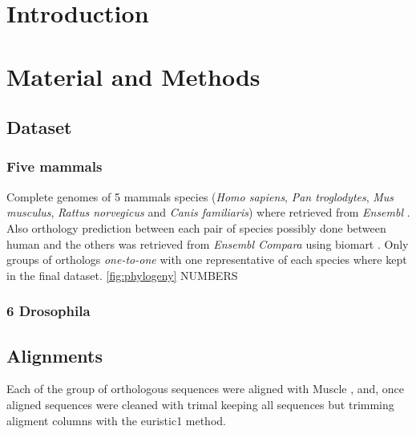 

\section{Introduction}

\section{Material and Methods}

\subsection{Dataset}

\subsubsection{Five mammals}

Complete genomes of 5 mammals species (\textit{Homo sapiens}, \textit{Pan troglodytes}, \textit{Mus musculus}, \textit{Rattus norvegicus} and \textit{Canis familiaris}) where retrieved from \textit{Ensembl} \cite{Flicek2011}. Also orthology prediction between each pair of species
possibly done between human and the others was retrieved from \textit{Ensembl Compara} \cite{Vilella2009} using biomart \cite{Kinsella2011}. Only groups of orthologs \textit{one-to-one} with one representative of each species where kept in the final dataset. \ref{fig:phylogeny}
NUMBERS

\subsubsection{6 Drosophila}

\subsection{Alignments}
Each of the group of orthologous sequences were aligned with Muscle \cite{Edgar2004}, and, once aligned sequences were cleaned with trimal \cite{Capella-Gutierrez2009} keeping all sequences but trimming aligment columns with the euristic1 method.


